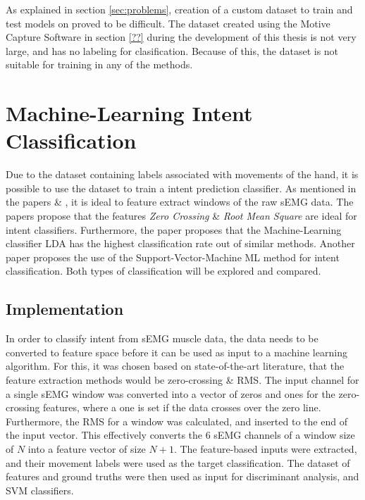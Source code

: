 \documentclass[../main.tex]{subfiles}
\begin{document}
As explained in section \ref{sec:problems}, creation of a custom dataset to train and test models on proved to be difficult.
The dataset created using the Motive Capture Software in section \ref{??} during the development of this thesis is not very large, and has no labeling for clasification.
Because of this, the dataset is not suitable for training in any of the methods.


\newpage
\section{Machine-Learning Intent Classification}

Due to the dataset containing labels associated with movements of the hand, it is possible to use the dataset to train a intent prediction classifier.
As mentioned in the papers \cite{??} \& \cite{??}, it is ideal to feature extract windows of the raw sEMG data.
The papers propose that the features \textit{Zero Crossing} \& \textit{Root Mean Square} are ideal for intent classifiers.
Furthermore, the paper \cite{??} proposes that the Machine-Learning classifier LDA has the highest classification rate out of similar methods.
Another paper \cite{??} proposes the use of the Support-Vector-Machine ML method for intent  classification.
Both types of classification will be explored and compared.

\subsection{Implementation}

In order to classify intent from sEMG muscle data, the data needs to be converted to feature space before it can be used as input to a machine learning algorithm.
For this, it was chosen based on state-of-the-art literature, that the feature extraction methods would be zero-crossing \& RMS.
The input channel for a single sEMG window was converted into a vector of zeros and ones for the zero-crossing features, where a one is set if the data crosses over the zero line.
Furthermore, the RMS for a window was calculated, and inserted to the end of the input vector. This effectively converts the 6 sEMG channels of a window size of $N$ into a feature vector of size $N+1$.
The feature-based inputs were extracted, and their movement labels were used as the target classification.
The dataset of features and ground truths were then used as input for discriminant analysis, and SVM classifiers.
\end{document}
